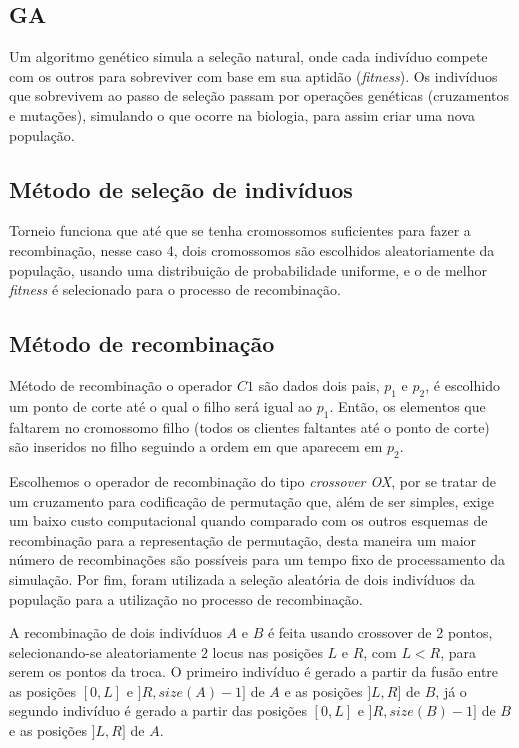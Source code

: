 \documentclass[12pt,a4paper]{article}
\begin{document}
\subsection{GA}
\label{sec:alg_genetic}

Um algoritmo genético simula a seleção natural, onde cada indivíduo compete com os outros para sobreviver com base em sua aptidão (\emph{fitness}). Os indivíduos que sobrevivem ao passo de
seleção passam por operações genéticas (cruzamentos e mutações), simulando o que ocorre na biologia, para assim criar uma nova população.

    \subsection{Método de seleção de indivíduos}

        Torneio funciona que até que se tenha cromossomos suficientes para fazer a recombinação, nesse caso 4, dois cromossomos são escolhidos aleatoriamente da população, usando uma distribuição de
        probabilidade uniforme, e o de melhor \textit{fitness} é selecionado para o processo de recombinação.

    \subsection{Método de recombinação}

        Método de recombinação o operador $C1$ são dados dois pais, $p_1$ e $p_2$, é escolhido um ponto de corte até o qual o filho será igual ao $p_1$. Então, os elementos que faltarem no
        cromossomo filho (todos os clientes faltantes até o ponto de corte) são inseridos no filho seguindo a ordem em que aparecem em $p_2$. 

        Escolhemos o operador de recombinação do tipo \emph{crossover OX}, por se tratar de um cruzamento para codificação de permutação que, além de ser simples, exige um baixo custo computacional
        quando comparado com os outros esquemas de recombinação para a representação de permutação, desta maneira um maior número de recombinações são possíveis para um tempo fixo de processamento
        da simulação. Por fim, foram utilizada a seleção aleatória de dois indivíduos da população para a utilização no processo de recombinação.

        A recombinação de dois indivíduos $A$ e $B$ é feita usando crossover de 2 pontos, selecionando-se aleatoriamente $2$ locus nas posições $L$ e $R$, com $L < R$, para serem os pontos da troca.
        O primeiro indivíduo é gerado a partir da fusão entre as posições $[0, L]$ e $]R, size(A) - 1]$ de $A$ e as posições $]L, R]$ de $B$, já o segundo indivíduo é gerado a partir das posições
        $[0, L]$ e $]R, size(B) - 1]$ de $B$ e as posições $]L, R]$ de $A$.
\end{document}
